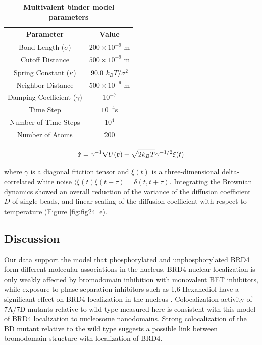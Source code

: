 \begin{table}[h!]
\centering
\begin{tabular}{|c|c|}
\hline
\textbf{Parameter} & \textbf{Value} \\ \hline
Bond Length ($\sigma$) & $200 \times 10^{-9}$ m \\ \hline
Cutoff Distance & $500 \times 10^{-9}$ m \\ \hline
Spring Constant ($\kappa$) & 90.0 $k_{B}T/\sigma^2$ \\ \hline
Neighbor Distance & $500 \times 10^{-9}$ m \\ \hline
Damping Coefficient ($\gamma$) & $10^{-7}$ \\ \hline
Time Step & $10^{-4}$s\\ \hline
Number of Time Steps & $10^4$ \\ \hline
Number of Atoms & 200 \\ \hline
\end{tabular}
\caption{\textbf{Multivalent binder model parameters}}
\end{table}

\begin{equation*}
\dot{\bold{r}} = \gamma^{-1}\nabla U(\bold{r}) +\sqrt{2 k_{B}T}\gamma^{-1/2}\xi(t)
\end{equation*}

where $\gamma$ is a diagonal friction tensor and $\xi(t)$ is a three-dimensional delta-correlated white noise $\langle \xi(t)\xi(t+\tau)  = \delta(t,t+\tau)$. Integrating the Brownian dynamics showed an overall reduction of the variance of the diffusion coefficient $D$ of single beads, and linear scaling of the diffusion coefficient with respect to temperature (Figure \ref{fig:fig24} e).

\subsection{Discussion}

Our data support the model that phosphorylated and unphosphorylated BRD4 form different molecular associations in the nucleus. BRD4 nuclear localization is only weakly affected by bromodomain inhibition with monovalent BET inhibitors, while exposure to phase separation inhibitors such as 1,6 Hexanediol have a significant effect on BRD4 localization in the nucleus \parencite{Han2020}. Colocalization activity of 7A/7D mutants relative to wild type measured here is consistent with this model of BRD4 localization to nucleosome nanodomains. Strong colocalization of the BD mutant relative to the wild type suggests a possible link between bromodomain structure with localization of BRD4. 

